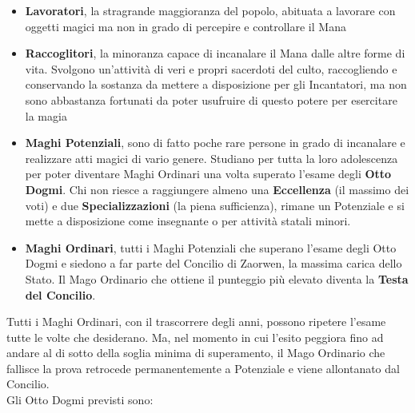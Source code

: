 \documentclass[a4paper]{scrreprt}
\begin{document}
\begin{itemize}
\item \textbf{Lavoratori}, la stragrande maggioranza del popolo, abituata a lavorare con oggetti magici ma non in grado di percepire e controllare il Mana
\item \textbf{Raccoglitori}, la minoranza capace di incanalare il Mana dalle altre forme di vita. Svolgono un'attività di veri e propri sacerdoti del culto, raccogliendo e conservando la sostanza da mettere a disposizione per gli Incantatori, ma non sono abbastanza fortunati da poter usufruire di questo potere per esercitare la magia
\item \textbf{Maghi Potenziali}, sono di fatto poche rare persone in grado di incanalare e realizzare atti magici di vario genere. Studiano per tutta la loro adolescenza per poter diventare Maghi Ordinari una volta superato l'esame degli \textbf{Otto Dogmi}. Chi non riesce a raggiungere almeno una \textbf{Eccellenza} (il massimo dei voti) e due \textbf{Specializzazioni} (la piena sufficienza), rimane un Potenziale e si mette a disposizione come insegnante o per attività statali minori.
\item \textbf{Maghi Ordinari}, tutti i Maghi Potenziali che superano l'esame degli Otto Dogmi e siedono a far parte del Concilio di Zaorwen, la massima carica dello Stato. Il Mago Ordinario che ottiene il punteggio più elevato diventa la \textbf{Testa del Concilio}.
\end{itemize}

Tutti i Maghi Ordinari, con il trascorrere degli anni, possono ripetere l'esame tutte le volte che desiderano. Ma, nel momento in cui l'esito peggiora fino ad andare al di sotto della soglia minima di superamento, il Mago Ordinario che fallisce la prova retrocede permanentemente a Potenziale e viene allontanato dal Concilio.\\
Gli Otto Dogmi previsti sono:
\end{document}
